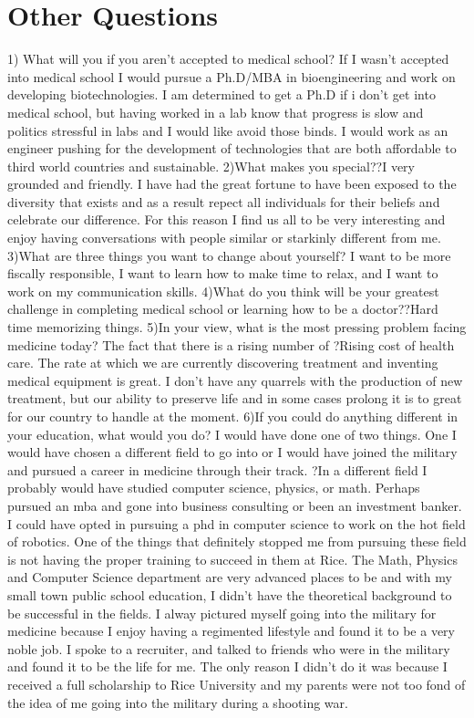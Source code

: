 \documentclass[12pt,a4paper,article]{memoir} %
\begin{document}
\chapter{Other Questions}
1) What will you if you aren't accepted to medical school?
If I wasn't accepted into medical school I would pursue a Ph.D/MBA in bioengineering and work on developing biotechnologies. I am determined to get a Ph.D if i don't get into medical school, but having worked in a lab know that progress is slow and politics stressful in labs and I would like avoid those binds.  I would work as an engineer pushing for the development of technologies that are both affordable to third world countries and sustainable.  
 2)What makes you special??I very grounded and friendly.  I have had the great fortune to have been exposed to the diversity that exists and as a result repect all individuals for their beliefs and celebrate our difference. For this reason I find us all to be very interesting and enjoy having conversations with people similar or starkinly different from me.
3)What are three things you want to change about yourself?
I want to be more fiscally responsible, I want to learn how to make time to relax, and I want to work on my communication skills.
4)What do you think will be your greatest challenge in completing medical school or learning how to be a doctor??Hard time memorizing things. 
5)In your view, what is the most pressing problem facing medicine today?
The fact that there is a rising number of ?Rising cost of health care.  The rate at which we are currently discovering treatment and inventing medical equipment is great.  I don't have any quarrels with the production of new treatment, but our ability to preserve life and in some cases prolong it is to great for our country to handle at the moment.
6)If you could do anything different in your education, what would you do?
I would have done one of two things.  One I would have chosen a different field to go into or I would have joined the military and pursued a career in medicine through their track.  ?In a different field I probably would have studied computer science, physics, or math.  Perhaps pursued an mba and gone into business consulting or been an investment banker.  I could have opted in pursuing a phd in computer science to work on the hot field of robotics.  One of the things that definitely stopped me from pursuing these field is not having the proper training to succeed in them at Rice.  The Math, Physics and Computer Science department are very advanced places to be and with my small town public school education, I didn't have the theoretical background to be successful in the fields.  
I alway pictured myself going into the military for medicine because I enjoy having a regimented lifestyle and found it to be a very noble job.  I spoke to a recruiter, and talked to friends who were in the military and found it to be the life for me.  The only reason I didn't do it was because I received a full scholarship to Rice University and my parents were not too fond of the idea of me going into the military during a shooting war.
\end{document}
